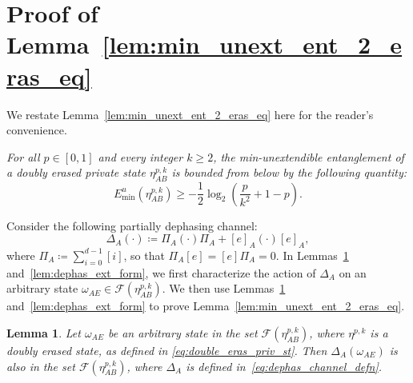 \documentclass[twocolumn,letterpaper, dvipsnames,allowtoday, accepted = 2025-12-31]{quantumarticle}
\newtheorem{lemma}{Lemma}
\begin{document}
\section{Proof of Lemma~\ref{lem:min_unext_ent_2_eras_eq}}\label{app:min_unext_ent_2_eras_eq}

We restate Lemma~\ref{lem:min_unext_ent_2_eras_eq} here for the reader's convenience.

\emph{
    For all $p \in [0,1]$ and every integer $k \geq 2$, the min-unextendible entanglement of a doubly erased private state $\eta^{p,k}_{AB}$ is bounded from below by the following quantity:}
    \begin{equation}
        E^u_{\min}\!\left(\eta^{p,k}_{AB}\right) \ge -\frac{1}{2}\log_2\!\left(\frac{p}{k^2} + 1-p\right)  .
    \end{equation}

\medskip

Consider the following partially dephasing channel:
\begin{equation}\label{eq:dephas_channel_defn}
        \Delta_{A}\!\left(\cdot\right) \coloneqq \Pi_A\left(\cdot\right)\Pi_A + [e]_A\left(\cdot\right)[e]_A,
\end{equation}
where $\Pi_A \coloneqq \sum_{i=0}^{d-1} [i]$, so that $\Pi_A [e] = [e]\Pi_A = 0$.
In Lemmas~\ref{lem:dephased_ext} and~\ref{lem:dephas_ext_form}, 
we first characterize the action of $\Delta_A$ on an arbitrary state $\omega_{AE} \in \mathcal{F}\!\left(\eta^{p,k}_{AB}\right)$. We then use  Lemmas~\ref{lem:dephased_ext} and~\ref{lem:dephas_ext_form} to prove Lemma~\ref{lem:min_unext_ent_2_eras_eq}.

\begin{lemma}\label{lem:dephased_ext}
    Let $\omega_{AE}$ be an arbitrary state in the set $\mathcal{F}\!\left(\eta^{p,k}_{AB}\right)$, where $\eta^{p,k}$ is a doubly erased state, as defined in \eqref{eq:double_eras_priv_st}. Then $\Delta_A\!\left(\omega_{AE}\right)$  is also in the set $\mathcal{F}\!\left(\eta^{p,k}_{AB}\right)$, where $\Delta_A$ is defined in~\eqref{eq:dephas_channel_defn}.
\end{lemma}
\end{document}
